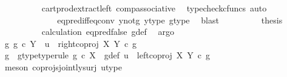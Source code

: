 \begin{isabellebody}
\ \ \ \ \ \ \ \ \isamarkupfalse%
\ cart{\isacharunderscore}{\kern0pt}prod{\isacharunderscore}{\kern0pt}extract{\isacharunderscore}{\kern0pt}left\ comp{\isacharunderscore}{\kern0pt}associative{}\ \isamarkupfalse%
\ {\isacharparenleft}{\kern0pt}typecheck{\isacharunderscore}{\kern0pt}cfuncs{\isacharcomma}{\kern0pt}\ auto{\isacharparenright}{\kern0pt}\isanewline
\ \ \ \ \ \ \isamarkupfalse%
\ \isamarkupfalse%
\ {\isachardoublequoteopen}{\isachardot}{\kern0pt}{\isachardot}{\kern0pt}{\isachardot}{\kern0pt}\ {\isacharequal}{\kern0pt}\ {\isasymf}{\isachardoublequoteclose}\isanewline
\ \ \ \ \ \ \ \ \isamarkupfalse%
\ eq{\isacharunderscore}{\kern0pt}pred{\isacharunderscore}{\kern0pt}iff{\isacharunderscore}{\kern0pt}eq{\isacharunderscore}{\kern0pt}conv\ y{\isacharunderscore}{\kern0pt}not{\isacharunderscore}{\kern0pt}g\ y{\isacharunderscore}{\kern0pt}type\ g{\isacharunderscore}{\kern0pt}type\ \isamarkupfalse%
\ blast\isanewline
\ \ \ \ \ \ \isamarkupfalse%
\ \isamarkupfalse%
\ {\isacharquery}{\kern0pt}thesis\isanewline
\ \ \ \ \ \ \ \ \isamarkupfalse%
\ calculation\ eq{\isacharunderscore}{\kern0pt}pred{\isacharunderscore}{\kern0pt}false\ g{\isacharunderscore}{\kern0pt}def\ \isamarkupfalse%
\ argo\isanewline
\ \ \ \ \isamarkupfalse%
\isanewline
\ \ \isamarkupfalse%
\isanewline
\ \ \ \ \isamarkupfalse%
\ {\isachardoublequoteopen}{\isasymnexists}g{\isachardot}{\kern0pt}\ g\ {\isasymin}\isactrlsub c\ Y\ {\isasymand}\ u\ {\isacharequal}{\kern0pt}\ right{\isacharunderscore}{\kern0pt}coproj\ X\ Y\ {\isasymcirc}\isactrlsub c\ g{\isachardoublequoteclose}\isanewline
\ \ \ \ \isamarkupfalse%
\ \isamarkupfalse%
\ g\ \ g{\isacharunderscore}{\kern0pt}type{\isacharbrackleft}{\kern0pt}type{\isacharunderscore}{\kern0pt}rule{\isacharbrackright}{\kern0pt}{\isacharcolon}{\kern0pt}\ {\isachardoublequoteopen}g\ {\isasymin}\isactrlsub c\ X{\isachardoublequoteclose}\ \ g{\isacharunderscore}{\kern0pt}def{\isacharcolon}{\kern0pt}\ {\isachardoublequoteopen}u\ {\isacharequal}{\kern0pt}\ left{\isacharunderscore}{\kern0pt}coproj\ X\ Y\ {\isasymcirc}\isactrlsub c\ g{\isachardoublequoteclose}\isanewline
\ \ \ \ \ \ \isamarkupfalse%
\ {\isacharparenleft}{\kern0pt}meson\ coprojs{\isacharunderscore}{\kern0pt}jointly{\isacharunderscore}{\kern0pt}surj\ u{\isacharunderscore}{\kern0pt}type{\isacharparenright}{\kern0pt}\isanewline

\end{isabellebody}

